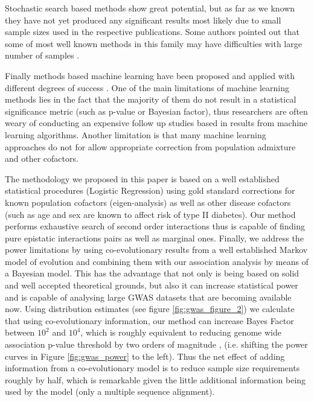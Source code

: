 Stochastic search based methods \cite{zhang2007bayesian} show great potential, but as far as we known they have not yet produced any significant results most likely due to small sample sizes used in the respective publications. 
Some authors pointed out that some of most well known methods in this family may have difficulties with large number of samples \cite{de2013emerging}.

Finally methods based machine learning have been proposed and applied with different degrees of success \cite{koo2013review, cordell2009detecting, li2011detecting}.
One of the main limitations of machine learning methods lies in the fact that the majority of them do not result in a statistical significance metric (such as p-value or Bayesian factor), thus researchers are often weary of conducting an expensive follow up studies based in results from machine learning algorithms.
Another limitation is that many machine learning approaches do not for allow appropriate correction from population admixture and other cofactors.

The methodology we proposed in this paper is based on a well established statistical procedures (Logistic Regression) using gold standard corrections for known population cofactors (eigen-analysis) as well as other disease cofactors (such as age and sex are known to affect risk of type II diabetes).
Our method performs exhaustive search of second order interactions thus is capable of finding pure epistatic interactions pairs as well as marginal ones.
Finally, we address the power limitations by using co-evolutionary results from a well established Markov model of evolution and combining them with our association analysis by means of a Bayesian model.
This has the advantage that not only is being based on solid and well accepted theoretical grounds, but also it can increase statistical power and is capable of analysing large GWAS datasets that are becoming available now.
%
Using distribution estimates (see figure \ref{fig:gwas_figure_2}) we calculate that using co-evolutionary information, our method can increase Bayes Factor between $10^2$ and $10^4$, which is roughly equivalent to reducing genome wide association p-value threshold by two orders of magnitude \cite{goodman1999toward}, (i.e. shifting the power curves in Figure \ref{fig:gwas_power} to the left).
Thus the net effect of adding information from a co-evolutionary model is to reduce sample size requirements roughly by half, which is remarkable given the little additional information being used by the model (only a multiple sequence alignment).

